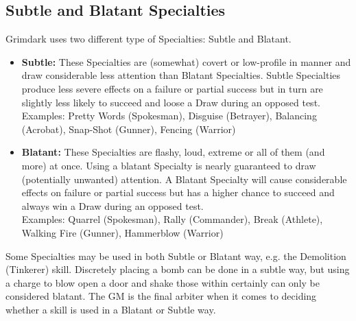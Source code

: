 \subsection{Subtle and Blatant Specialties}
\label{skill_types}
Grimdark uses two different type of Specialties: Subtle and Blatant.
\begin{itemize}
	\item \textbf{Subtle:} These Specialties are (somewhat) covert or low-profile in manner and draw considerable less attention than Blatant Specialties. 
	Subtle Specialties produce less severe effects on a failure or partial success but in turn are slightly less likely to succeed and loose a Draw during an opposed test.\\
	Examples: Pretty Words (Spokesman), Disguise (Betrayer), Balancing (Acrobat), Snap-Shot (Gunner), Fencing (Warrior)

	\item \textbf{Blatant:} These Specialties are flashy, loud, extreme or all of them (and more) at once. 
	Using a blatant Specialty is nearly guaranteed to draw (potentially unwanted) attention.
	A Blatant Specialty will cause considerable effects on failure or partial success but has a higher chance to succeed and always win a Draw during an opposed test.\\
	Examples: Quarrel (Spokesman), Rally (Commander), Break (Athlete), Walking Fire (Gunner), Hammerblow (Warrior)
\end{itemize}
Some Specialties may be used in both Subtle or Blatant way, e.g. the Demolition (Tinkerer) skill. 
Discretely placing a bomb can be done in a subtle way, but using a charge to blow open a door and shake those within certainly can only be considered blatant.
The GM is the final arbiter when it comes to deciding whether a skill is used in a Blatant or Subtle way.

\onecolumn

\twocolumn
